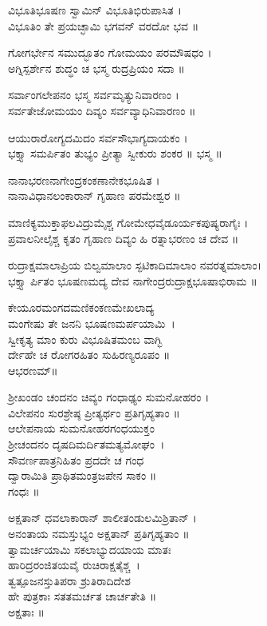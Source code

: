 ವಿಭೂತಿಭೂಷಣ ಸ್ವಾಮಿನ್ ವಿಭೂತಿಭಿರುಪಾಸಿತ ।\\
ವಿಭೂತಿಂ ತೇ ಪ್ರಯಚ್ಛಾಮಿ ಭಗವನ್ ವರದೋ ಭವ ॥

ಗೋಗರ್ಭೇನ ಸಮುದ್ಭೂತಂ ಗೋಮಯಂ ಪರಮೌಷಧಂ ।\\
ಅಗ್ನಿಸ್ಪರ್ಶೇನ ಶುದ್ಧಂ ಚ ಭಸ್ಮ ರುದ್ರಪ್ರಿಯಂ ಸದಾ ॥

ಸರ್ವಾಂಗಲೇಪನಂ ಭಸ್ಮ ಸರ್ವಮೃತ್ಯುನಿವಾರಣಂ ।\\
ಸರ್ವತೇಜೋಮಯಂ ದಿವ್ಯಂ ಸರ್ವವ್ಯಾಧಿನಿವಾರಣಂ ॥

ಆಯುರಾರೋಗ್ಯದಮಿದಂ ಸರ್ವಸೌಭಾಗ್ಯದಾಯಕಂ ।\\
ಭಕ್ತ್ಯಾ ಸಮರ್ಪಿತಂ ತುಭ್ಯಂ ಪ್ರೀತ್ಯಾ ಸ್ವೀಕುರು ಶಂಕರ ॥ ಭಸ್ಮ ॥


ನಾನಾಭರಣನಾಗೇಂದ್ರಕಂಕಣಾನೇಕಭೂಷಿತ ।\\
ನಾನಾವಿಧಾನಲಂಕಾರಾನ್ ಗೃಹಾಣ ಪರಮೇಶ್ವರ ॥

ಮಾಣಿಕ್ಯಮುಕ್ತಾಫಲವಿದ್ರುಮೈಶ್ಚ ಗೋಮೇಧವೈಡೂರ್ಯಕಪುಷ್ಯರಾಗೈಃ ।\\
ಪ್ರವಾಲನೀಲೈಶ್ಚ ಕೃತಂ ಗೃಹಾಣ ದಿವ್ಯಂ ಹಿ ರತ್ನಾಭರಣಂ ಚ ದೇವ ॥

ರುದ್ರಾಕ್ಷಮಾಲಾಪ್ರಿಯ ಬಿಲ್ವಮಾಲಾಂ ಸ್ಫಟಿಕಾದಿಮಾಲಾಂ ನವರತ್ನಮಾಲಾಂ।\\
ಭಕ್ತ್ಯಾ ರ್ಪಿತಂ  ಭೂಷಣಮದ್ಯ  ದೇವ ನಾಗೇಂದ್ರರುದ್ರಾಕ್ಷಭೂಷಾಭಿರಾಮ ॥

ಕೇಯೂರಮಂಗದಮಣಿಕಂಕಣಮೇಖಲಾದ್ಯ\\ಮಂಗೇಷು ತೇ ಜನನಿ ಭೂಷಣಮರ್ಪಯಾಮಿ~।\\
ಸ್ವೀಕೃತ್ಯ ಮಾಂ ಕುರು ವಿಭೂಷಿತಮಂಬ ವಾಗ್ಭಿ\\ರ್ದೇಹೇ ಚ ರೋಗರಹಿತಂ ಸುಹಿರಣ್ಯರೂಪಂ ॥\\
ಆಭರಣಮ್॥

ಶ್ರೀಖಂಡಂ ಚಂದನಂ ಚಿವ್ಯಂ ಗಂಧಾಢ್ಯಂ ಸುಮನೋಹರಂ ।\\
ವಿಲೇಪನಂ ಸುರಶ್ರೇಷ್ಠ ಪ್ರೀತ್ಯರ್ಥಂ ಪ್ರತಿಗೃಹ್ಯತಾಂ ॥ \\
ಆಲೇಪನಾಯ ಸುಮನೋಹರಗಂಧಯುಕ್ತಂ\\ ಶ್ರೀಚಂದನಂ ದೃಷದಿಮರ್ದಿತಮತ್ಯಮೋಘಂ~।\\
ಸೌವರ್ಣಪಾತ್ರನಿಹಿತಂ ಪ್ರದದೇ ಚ ಗಂಧ\-\\ದ್ವಾರಾಮಿತಿ ಪ್ರಾಥಿತಮಂತ್ರಜಪೇನ ಸಾಕಂ ॥\\
ಗಂಧಃ ॥


ಅಕ್ಷತಾನ್ ಧವಲಾಕಾರಾನ್ ಶಾಲೀತಂಡುಲಮಿಶ್ರಿತಾನ್ ।\\
ಅನಂತಾಯ ನಮಸ್ತುಭ್ಯಂ  ಅಕ್ಷತಾನ್ ಪ್ರತಿಗೃಹ್ಯತಾಂ ॥\\
ತ್ವಾಮರ್ಚಯಾಮಿ ಸಕಲಾಭ್ಯುದಯಾಯ ಮಾತಃ\\ಹಾರಿದ್ರರಂಜಿತಯವೈ ರುಚಿರಾಕ್ಷತೈಶ್ಚ~।\\
ತ್ವತ್ಪೂಜನಸ್ತುತಿಪರಾ ಶ್ರುತಿರಾದಿದೇಶ \\ಹೇ ಪುತ್ರಕಾಃ ಸತತಮರ್ಚತ ಚಾರ್ಚತೇತಿ ॥\\
ಅಕ್ಷತಾಃ ॥

